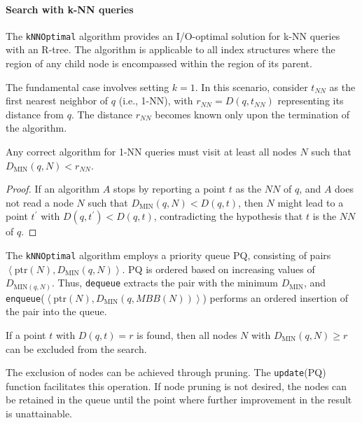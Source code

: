 \paragraph*{Search with k-NN queries}
The \texttt{kNNOptimal} algorithm provides an I/O-optimal solution for k-NN queries with an R-tree. 
The algorithm is applicable to all index structures where the region of any child node is encompassed within the region of its parent.

The fundamental case involves setting $k=1$. 
In this scenario, consider $t_{NN}$ as the first nearest neighbor of $q$ (i.e., 1-NN), with $r_{NN}=D(q,t_{NN})$ representing its distance from $q$. 
The distance $r_{NN}$ becomes known only upon the termination of the algorithm.
\begin{theorem}
    Any correct algorithm for 1-NN queries must visit at least all nodes $N$ such that $D_{\text{MIN}}(q,N) < r_{NN}$.
\end{theorem}
\begin{proof}
    If an algorithm $A$ stops by reporting a point $t$ as the $NN$ of $q$, and $A$ does not read a node $N$ such that $D_{\text{MIN}}(q,N) < D(q,t)$, then $N$ might lead to a point $t^\prime$ with $D(q,t^\prime) < D(q,t)$, contradicting the hypothesis that $t$ is the $NN$ of $q$.
\end{proof}

The \texttt{kNNOptimal} algorithm employs a priority queue PQ, consisting of pairs $\left\langle \text{ptr}(N), D_{\text{MIN}}(q,N)\right\rangle $. 
PQ is ordered based on increasing values of $D_{\text{MIN}(q,N)}$. 
Thus, \texttt{dequeue} extracts the pair with the minimum $D_{\text{MIN}}$, and \texttt{enqueue}($\left\langle \text{ptr}(N), D_{\text{MIN}}(q,MBB(N)) \right\rangle $) performs an ordered insertion of the pair into the queue.
\begin{property}
    If a point $t$ with $D(q,t) = r$ is found, then all nodes $N$ with $D_{\text{MIN}}(q,N) \geq r$ can be excluded from the search.
\end{property}
The exclusion of nodes can be achieved through pruning. 
The \texttt{update}(PQ) function facilitates this operation. 
If node pruning is not desired, the nodes can be retained in the queue until the point where further improvement in the result is unattainable.

